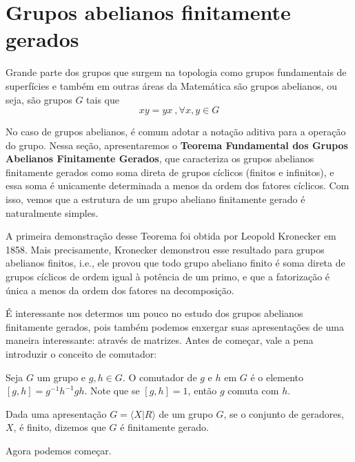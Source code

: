 	\section{Grupos abelianos finitamente gerados}
	Grande parte dos grupos que surgem na topologia como grupos fundamentais de superfícies e também em outras áreas da Matemática são grupos abelianos, ou seja, são grupos $G$ tais que
	\begin{equation*}
	xy = yx\ , \forall x,y\in G
	\end{equation*}
	\par\vspace{0.3cm} No caso de grupos abelianos, é comum adotar a notação aditiva para a operação do grupo. Nessa seção, apresentaremos o \textbf{Teorema Fundamental dos Grupos Abelianos Finitamente Gerados}, que caracteriza os grupos abelianos finitamente gerados como soma direta de grupos cíclicos (finitos e infinitos), e essa soma é unicamente determinada a menos da ordem dos fatores cíclicos. Com isso, vemos que a estrutura de um grupo abeliano finitamente gerado é naturalmente simples. 
	\par\vspace{0.3cm} A primeira demonstração desse Teorema foi obtida por Leopold Kronecker em 1858. Mais precisamente, Kronecker demonstrou esse resultado para grupos abelianos finitos, i.e., ele provou que todo grupo abeliano finito é soma direta de grupos cíclicos de ordem igual à potência de um primo, e que a fatorização é única a menos da ordem dos fatores na decomposição.
	\par\vspace{0.3cm} É interessante nos determos um pouco no estudo dos grupos abelianos finitamente gerados, pois também podemos enxergar suas apresentações de uma maneira interessante: através de matrizes. Antes de começar, vale a pena introduzir o conceito de comutador:
	\begin{deff}
		\label{def comutador}
		Seja $G$ um grupo e $g,h\in G$. O comutador de $g$ e $h$ em $G$ é o elemento $[g,h] = g^{-1}h^{-1}gh$. Note que se $[g,h]=1$, então $g$ comuta com $h$.
	\end{deff}
	\begin{deff}
		\label{def grupo finitamente gerado}
		Dada uma apresentação $G = \langle  X|R \rangle$ de um grupo $G$, se o conjunto de geradores, $X$, é finito, dizemos que $G$ é finitamente gerado.
	\end{deff}
	\par\vspace{0.3cm} Agora podemos começar.
